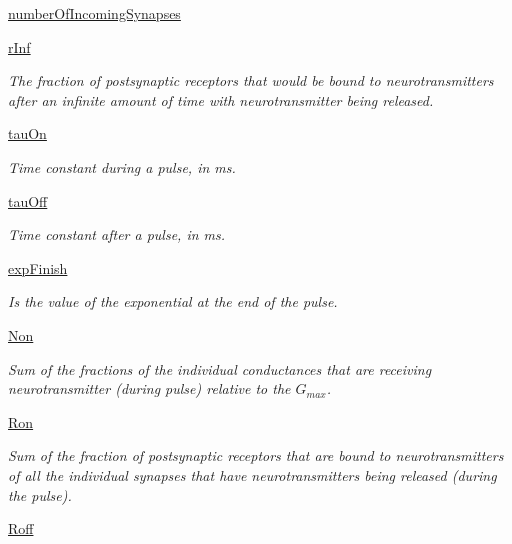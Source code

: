\begin{DoxyCompactItemize}
\hyperlink{class_synapse_1_1_synapse_a6e55e008336cc47551669f3d77248d57}{number\+Of\+Incoming\+Synapses}
\item 
\hyperlink{class_synapse_1_1_synapse_afd263d49a97910efd8955a2aadef50e0}{r\+Inf}
\begin{DoxyCompactList}\small\item\em The fraction of postsynaptic receptors that would be bound to neurotransmitters after an infinite amount of time with neurotransmitter being released. \end{DoxyCompactList}\item 
\hyperlink{class_synapse_1_1_synapse_aae46f8edd1e94ea2ab51e3612afd3a3f}{tau\+On}
\begin{DoxyCompactList}\small\item\em Time constant during a pulse, in ms. \end{DoxyCompactList}\item 
\hyperlink{class_synapse_1_1_synapse_afd5638a223c3fdcc672002dbced7bed0}{tau\+Off}
\begin{DoxyCompactList}\small\item\em Time constant after a pulse, in ms. \end{DoxyCompactList}\item 
\hyperlink{class_synapse_1_1_synapse_aa9ae256b272ceb8e9e4a931a9cd5d163}{exp\+Finish}
\begin{DoxyCompactList}\small\item\em Is the value of the exponential at the end of the pulse. \end{DoxyCompactList}\item 
\hyperlink{class_synapse_1_1_synapse_af8779bbc2ee2c5ae7747ee5cfbcf112e}{Non}
\begin{DoxyCompactList}\small\item\em Sum of the fractions of the individual conductances that are receiving neurotransmitter (during pulse) relative to the $G_{max}$. \end{DoxyCompactList}\item 
\hyperlink{class_synapse_1_1_synapse_ae759c51a7196995510fe3eb086050c76}{Ron}
\begin{DoxyCompactList}\small\item\em Sum of the fraction of postsynaptic receptors that are bound to neurotransmitters of all the individual synapses that have neurotransmitters being released (during the pulse). \end{DoxyCompactList}\item 
\hyperlink{class_synapse_1_1_synapse_ae67ffbbd23cd9c56f20bda9e8e040663}{Roff}

\end{DoxyCompactItemize}
